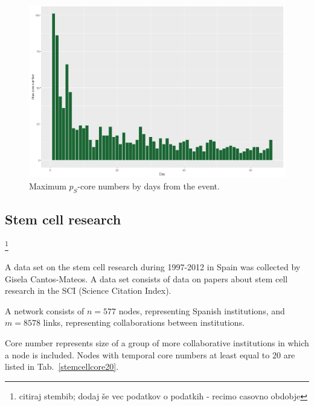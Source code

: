 \documentclass[a4paper,twoside,10pt]{article}
\begin{document}
\begin{figure}[!h]
	\centering
	\includegraphics[width=\textwidth]{./pics/terrorMaxPSCore.png}
  \caption{Maximum $p_S$-core numbers by days from the event.}
  \label{reuters}
\end{figure}


\subsection{Stem cell research}\footnote{citiraj stembib; dodaj še vec podatkov o podatkih - recimo casovno obdobje}

A data set on the stem cell research during 1997-2012 in Spain was collected by Gisela Cantos-Mateos. A data set consists of data on papers about stem cell research in the SCI (Science Citation Index).

A network consists of $n = 577$ nodes, representing Spanish institutions, and $m = 8578$ links, representing collaborations between institutions.

Core number represents size of a group of more collaborative institutions in which a node is included. Nodes with temporal core numbers at least equal to $20$ are listed in Tab.~\ref{stemcellcore20}.
\end{document}
